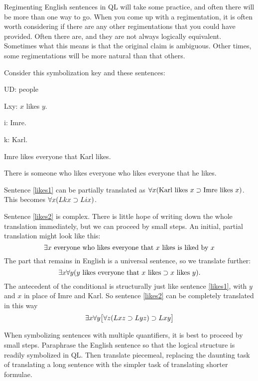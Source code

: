 Regimenting English sentences in QL will take some practice, and often there will be more than one way to go.
When you come up with a regimentation, it is often worth considering if there are any other regimentations that you could have provided.
Often there are, and they are not always logically equivalent.
Sometimes what this means is that the original claim is ambiguous.
Other times, some regimentations will be more natural than that others.

\iffalse

Consider this symbolization key and these sentences:
\begin{ekey}
\item[UD:] people
\item[Lxy:] $x$ likes $y$.
\item[i:] Imre.
\item[k:] Karl.
\end{ekey}
\begin{earg}
\item[\ex{likes1}]Imre likes everyone that Karl likes.
\item[\ex{likes2}]There is someone who likes everyone who likes everyone that he likes.
\end{earg}

Sentence \ref{likes1} can be partially translated as $\forall x(\mbox{Karl likes $x$}\supset\mbox{Imre likes $x$})$. This becomes $\forall x(Lkx\supset Lix)$.


Sentence \ref{likes2} is complex. There is little hope of writing down the whole translation immediately, but we can proceed by small steps. An initial, partial translation might look like this: $$\exists x\ \mbox{everyone who likes everyone that $x$ likes is liked by $x$}$$
The part that remains in English is a universal sentence, so we translate further: $$\exists x\forall y(\mbox{$y$ likes everyone that $x$ likes}\supset\mbox{$x$ likes $y$}).$$
The antecedent of the conditional is structurally just like sentence \ref{likes1}, with $y$ and $x$ in place of Imre and Karl. So sentence \ref{likes2} can be completely translated in this way $$\exists x\forall y\bigl[\forall z(Lxz \supset Lyz) \supset Lxy\bigr]$$

When symbolizing sentences with multiple quantifiers, it is best to proceed by small steps. Paraphrase the English sentence so that the logical structure is readily symbolized in QL. Then translate piecemeal, replacing the daunting task of translating a long sentence with the simpler task of translating shorter formulae.




